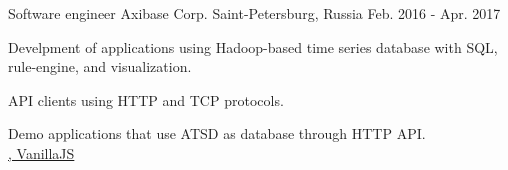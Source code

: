 

\begin{cventries}

  \cventry
    {Software engineer} %
    {Axibase Corp.} %
    {Saint-Petersburg, Russia} %
    {Feb. 2016 - Apr. 2017} %
    {
      \begin{cvitems} %
        \item {Develpment of applications using Hadoop-based time series database with SQL, rule-engine, and visualization.}
        \item {API clients using HTTP and TCP protocols.
          \\ \href{https://github.com/axibase/atsd-api-java}{\faGithubSquare\acvHeaderIconSep\@Java}
          \href{https://github.com/axibase/atsd-api-nodejs}{\faGithubSquare\acvHeaderIconSep\@NodeJS}
        }
        \item{ Demo applications that use ATSD as database through HTTP API.
          \\ \href{https://github.com/axibase/nodejs-dataslider}{\faGithubSquare\acvHeaderIconSep\@NodeJS, VanillaJS}
        }
      \end{cvitems}
    }


\end{cventries}
